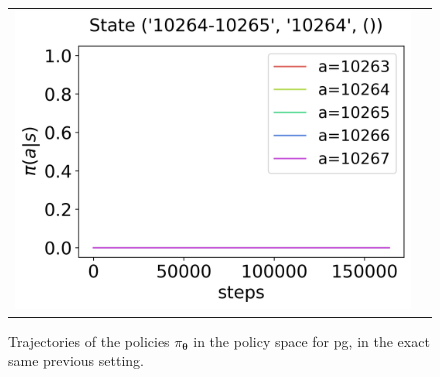 \begin{figure}[!htp]
\begin{tabular}{cc}
        \hspace*{-18pt}\includegraphics[scale=0.36,valign=b]{chapters/figures/policy_PG_state_3.png}
    \end{tabular}
    \caption{\small Trajectories of the policies $\pi_{\boldsymbol \theta}$ in the policy space for \acrshort{pg}, in the exact same previous setting.}
    \label{fig:sequence-policies-pg}
\end{figure}

